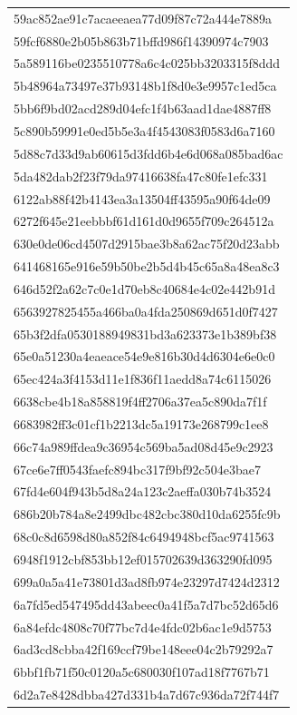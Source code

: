 \begin{tabular}{l}
59ac852ae91c7acaeeaea77d09f87c72a444e7889a \\
59fcf6880e2b05b863b71bffd986f14390974c7903 \\
5a589116be0235510778a6c4c025bb3203315f8ddd \\
5b48964a73497e37b93148b1f8d0e3e9957c1ed5ca \\
5bb6f9bd02acd289d04efc1f4b63aad1dae4887ff8 \\
5c890b59991e0ed5b5e3a4f4543083f0583d6a7160 \\
5d88c7d33d9ab60615d3fdd6b4e6d068a085bad6ac \\
5da482dab2f23f79da97416638fa47c80fe1efc331 \\
6122ab88f42b4143ea3a13504ff43595a90f64de09 \\
6272f645e21eebbbf61d161d0d9655f709c264512a \\
630e0de06cd4507d2915bae3b8a62ac75f20d23abb \\
641468165e916e59b50be2b5d4b45c65a8a48ea8c3 \\
646d52f2a62c7c0e1d70eb8c40684e4c02e442b91d \\
6563927825455a466ba0a4fda250869d651d0f7427 \\
65b3f2dfa0530188949831bd3a623373e1b389bf38 \\
65e0a51230a4eaeace54e9e816b30d4d6304e6e0c0 \\
65ec424a3f4153d11e1f836f11aedd8a74c6115026 \\
6638cbe4b18a858819f4ff2706a37ea5c890da7f1f \\
6683982ff3c01cf1b2213dc5a19173e268799c1ee8 \\
66c74a989ffdea9c36954c569ba5ad08d45e9c2923 \\
67ce6e7ff0543faefc894bc317f9bf92c504e3bae7 \\
67fd4e604f943b5d8a24a123c2aeffa030b74b3524 \\
686b20b784a8e2499dbc482cbc380d10da6255fc9b \\
68c0c8d6598d80a852f84c6494948bcf5ac9741563 \\
6948f1912cbf853bb12ef015702639d363290fd095 \\
699a0a5a41e73801d3ad8fb974e23297d7424d2312 \\
6a7fd5ed547495dd43abeec0a41f5a7d7bc52d65d6 \\
6a84efdc4808c70f77bc7d4e4fdc02b6ac1e9d5753 \\
6ad3cd8cbba42f169ccf79be148eee04c2b79292a7 \\
6bbf1fb71f50c0120a5c680030f107ad18f7767b71 \\
6d2a7e8428dbba427d331b4a7d67c936da72f744f7 \\

\end{tabular}
